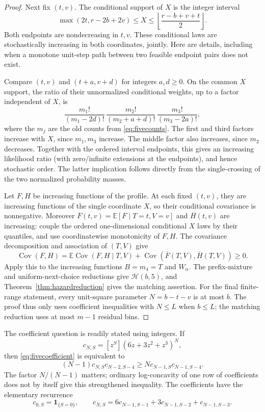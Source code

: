 \documentclass[11pt]{article}
\begin{document}
\begin{proof}
Next fix $(t,v)$. The conditional support of $X$ is the integer interval
\[
 \max(2t,r-2b+2v)\leq X\leq
                  \left\lfloor\frac{r-b+v+t}{2}\right\rfloor.
\]
Both endpoints are nondecreasing in $t,v$. These conditional laws
are stochastically increasing in both coordinates, jointly. Here
are details, including when a monotone unit-step path between two
feasible endpoint pairs does not exist.

Compare $(t,v)$ and $(t+a,v+d)$ for integers $a,d\geq0$.
On the common $X$ support, the ratio of their unnormalized
conditional weights, up to a factor independent of $X$, is
\[
 \frac{m_1!}{(m_1-2d)!}\,
 \frac{m_2!}{(m_2+a+d)!}\,
 \frac{m_3!}{(m_3-2a)!},
\]
where the $m_j$ are the old counts from \eqref{eq:fivecounts}.
The first and third factors increase with $X$, since $m_1,m_3$
increase. The middle factor also increases, since $m_2$ decreases.
Together with the ordered interval endpoints, this gives an increasing
likelihood ratio (with zero/infinite extensions at the endpoints),
and hence stochastic order. The latter implication follows directly
from the single-crossing of the two normalized probability masses.

Let $F,H$ be increasing functions of the profile. At each fixed
$(t,v)$, they are increasing functions of the single coordinate $X$,
so their conditional covariance is nonnegative. Moreover
$\overline F(t,v)=\mathbb E[F\mid T=t,V=v]$ and $\overline H(t,v)$
are increasing: couple the ordered one-dimensional conditional
$X$ laws by their quantiles, and use coordinatewise monotonicity
of $F,H$. The covariance decomposition and association of $(T,V)$
give
\[
 \operatorname{Cov}(F,H)
 =\mathbb E\operatorname{Cov}(F,H\mid T,V)
    +\operatorname{Cov}(\overline F(T,V),\overline H(T,V))\geq0.
\]
Apply this to the increasing functions $B=m_4=T$ and $W_\alpha$.
The prefix-mixture and uniform-next-choice reductions give
$\mathcal H(b,5)$, and Theorem~\ref{thm:hazardreduction} gives the
matching assertion.
For the final finite-range statement, every unit-square parameter
$N=b-t-v$ is at most $b$. The proof thus only uses coefficient
inequalities with $N\leq L$ when $b\leq L$; the matching reduction
uses at most $m-1$ residual bins.
\end{proof}

The coefficient question is readily stated using integers. If
\[
 c_{N,S}=[z^S](6z+3z^2+z^3)^N,
\]
then \eqref{eq:fivecoefficient} is equivalent to
\begin{equation}\label{eq:fiveinteger}
 (N-1)c_{N,S}c_{N-2,S-4}
 \geq N c_{N-1,S}c_{N-1,S-4}.
\end{equation}
The factor $N/(N-1)$ matters; ordinary log-concavity of one row
of coefficients does not by itself give this strengthened inequality.
The coefficients have the elementary recurrence
\[
 c_{0,S}=\mathbf1_{\{S=0\}},\qquad
 c_{N,S}=6c_{N-1,S-1}+3c_{N-1,S-2}+c_{N-1,S-3}.
\]
\end{document}
